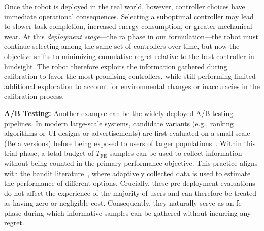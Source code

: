 \documentclass[twoside,11pt]{article}
\newcommand{\Tfe}{T_{\mathrm{FE}}}
\begin{document}
Once the robot is deployed in the real world, however, controller choices have immediate operational consequences. Selecting a suboptimal controller may lead to slower task completion, increased energy consumption, or greater mechanical wear. At this {\em deployment stage}---the \ac{ra} phase in our formulation---the robot must continue selecting among the same set of controllers over time, but now the objective shifts to minimizing cumulative regret relative to the best controller in hindsight. The robot therefore exploits the information gathered during calibration to favor the most promising controllers, while still performing limited additional exploration to account for environmental changes or inaccuracies in the calibration process.

\noindent
\textbf{A/B Testing:}
Another example can be the widely deployed A/B testing pipelines. In modern large-scale systems, candidate variants (e.g., ranking algorithms or UI designs or advertisements) are first evaluated on a small scale (Beta versions) before being exposed to users of larger populations~\citep{mao2019newsheadline,bubeck2011pure}. Within this trial phase, a total budget of $\Tfe$ samples can be used to collect information without being counted in the primary performance objective. This practice aligns with the bandit literature~\citep{bubeck2011pure,zhang2023fast,qin2024optimizing}, where adaptively collected data is used to estimate the performance of different options. Crucially, these pre-deployment evaluations do not affect the experience of the majority of users and can therefore be treated as having zero or negligible cost. Consequently, they naturally serve as an \ac{fe} phase during which informative samples can be gathered without incurring any regret.
\end{document}
